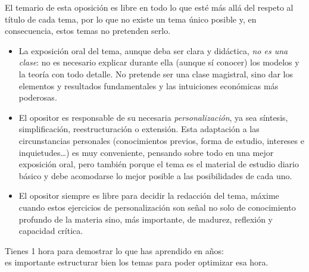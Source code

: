 \documentclass[11pt]{article}
\begin{document}
\tceetitulo

\begin{notaopositor}
El temario de esta oposición es libre en todo lo que esté más allá del respeto al título de cada tema, por lo que no existe un tema único posible y, en consecuencia, estos temas no pretenden serlo.
\begin{itemize}
\item La exposición oral del tema, aunque deba ser clara y didáctica, \emph{no es una clase}: no es necesario explicar durante ella (aunque sí conocer) los modelos y la teoría con todo detalle. No pretende ser una clase magistral, sino dar los elementos y resultados fundamentales y las intuiciones económicas más poderosas.
\item El opositor es responsable de su necesaria \emph{personalización}, ya sea síntesis, simplificación, reestructuración o extensión. Esta adaptación a las circunstancias personales (conocimientos previos, forma de estudio, intereses e inquietudes…) es muy conveniente, pensando sobre todo en una mejor exposición oral, pero también porque el tema es el material de estudio diario básico y debe acomodarse lo mejor posible a las posibilidades de cada uno.
\item El opositor siempre es libre para decidir la redacción del tema, máxime cuando estos ejercicios de personalización son señal no solo de conocimiento profundo de la materia sino, más importante, de madurez, reflexión y capacidad crítica.
\end{itemize}
\end{notaopositor}

\begin{ideaclave}
\centering Tienes 1 hora para demostrar lo que has aprendido en años:\\
es importante estructurar bien los temas para poder optimizar esa hora.
\end{ideaclave}
\end{document}
